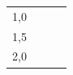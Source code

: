 {\begin{tabular}[t]{|l|l|l|l|}
        1,0 &
    
    
         &
    
    
         &
    
    
     \tabularnewline\cline{1-1}\cline{2-2}\cline{3-3}\cline{4-4}
    
    
        1,5 &
    
    
         &
    
    
         &
    
    
     \tabularnewline\cline{1-1}\cline{2-2}\cline{3-3}\cline{4-4}
    
    
        2,0 &
    

\end{tabular}}
